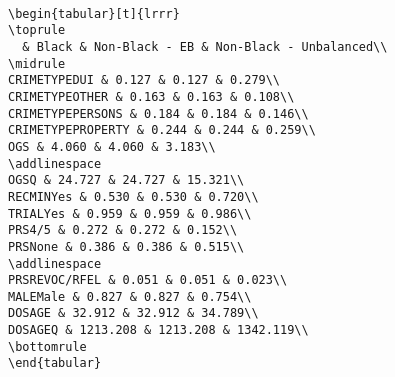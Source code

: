 \documentclass[
  letterpaper,
  DIV=11,
  numbers=noendperiod]{scrartcl}
\newenvironment{Shaded}{\begin{snugshade}}{\end{snugshade}}
\newcommand{\AttributeTok}[1]{\textcolor[rgb]{0.40,0.45,0.13}{#1}}
\newcommand{\ConstantTok}[1]{\textcolor[rgb]{0.56,0.35,0.01}{#1}}
\newcommand{\DecValTok}[1]{\textcolor[rgb]{0.68,0.00,0.00}{#1}}
\newcommand{\FunctionTok}[1]{\textcolor[rgb]{0.28,0.35,0.67}{#1}}
\newcommand{\NormalTok}[1]{\textcolor[rgb]{0.00,0.23,0.31}{#1}}
\newcommand{\OtherTok}[1]{\textcolor[rgb]{0.00,0.23,0.31}{#1}}
\newcommand{\SpecialCharTok}[1]{\textcolor[rgb]{0.37,0.37,0.37}{#1}}
\newcommand{\StringTok}[1]{\textcolor[rgb]{0.13,0.47,0.30}{#1}}
\begin{document}
\begin{Shaded}
\end{Shaded}

\begin{verbatim}

\begin{tabular}[t]{lrrr}
\toprule
  & Black & Non-Black - EB & Non-Black - Unbalanced\\
\midrule
CRIMETYPEDUI & 0.127 & 0.127 & 0.279\\
CRIMETYPEOTHER & 0.163 & 0.163 & 0.108\\
CRIMETYPEPERSONS & 0.184 & 0.184 & 0.146\\
CRIMETYPEPROPERTY & 0.244 & 0.244 & 0.259\\
OGS & 4.060 & 4.060 & 3.183\\
\addlinespace
OGSQ & 24.727 & 24.727 & 15.321\\
RECMINYes & 0.530 & 0.530 & 0.720\\
TRIALYes & 0.959 & 0.959 & 0.986\\
PRS4/5 & 0.272 & 0.272 & 0.152\\
PRSNone & 0.386 & 0.386 & 0.515\\
\addlinespace
PRSREVOC/RFEL & 0.051 & 0.051 & 0.023\\
MALEMale & 0.827 & 0.827 & 0.754\\
DOSAGE & 32.912 & 32.912 & 34.789\\
DOSAGEQ & 1213.208 & 1213.208 & 1342.119\\
\bottomrule
\end{tabular}
\end{verbatim}
\end{document}
